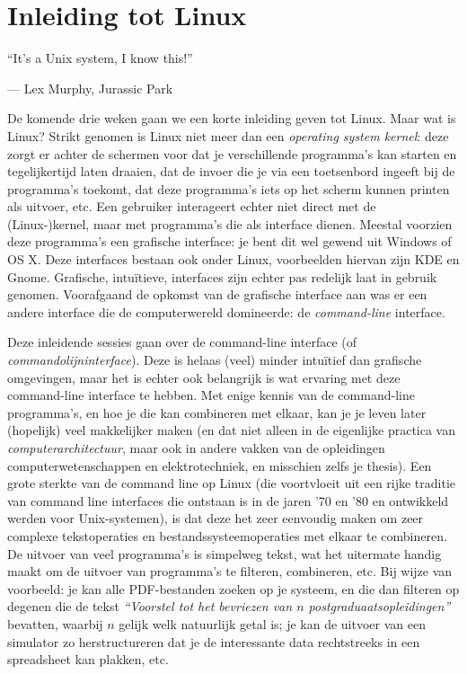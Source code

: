 \documentclass[a4paper,twoside,openany]{memoir}
\begin{document}
\epigraphfontsize{\small\itshape}

\chapter{Inleiding tot Linux}
\epigraph{``It’s a Unix system, I know this!''}{--- \textup{Lex Murphy}, Jurassic Park}

De komende drie weken gaan we een korte inleiding geven tot Linux. Maar wat is
Linux? Strikt genomen is Linux niet meer dan een \emph{operating system kernel}:
deze zorgt er achter de schermen voor dat je verschillende programma's kan
starten en tegelijkertijd laten draaien, dat de invoer die je via een
toetsenbord ingeeft bij de programma's toekomt, dat deze programma's iets op
het scherm kunnen printen als uitvoer, etc. Een gebruiker interageert echter
niet direct met de (Linux-)kernel, maar met programma's die als interface
dienen. Meestal voorzien deze programma's een grafische interface: je bent dit
wel gewend uit Windows of OS X. Deze interfaces bestaan ook onder Linux,
voorbeelden hiervan zijn KDE en Gnome. Grafische, intuïtieve, interfaces zijn
echter pas redelijk laat in gebruik genomen. Voorafgaand de opkomst van de
grafische interface aan was er een andere interface die de computerwereld
domineerde: de \emph{command-line} interface.

Deze inleidende sessies gaan over de command-line interface (of
\emph{commandolijninterface}). Deze is  helaas (veel) minder intuïtief
dan grafische omgevingen, maar het is echter ook belangrijk is wat ervaring
met deze command-line interface te hebben. Met enige kennis
van de command-line programma's, en hoe je die kan combineren met elkaar, kan je
je leven later (hopelijk) veel makkelijker maken (en dat niet alleen in de
eigenlijke practica van \emph{computerarchitectuur}, maar ook in andere vakken
van de opleidingen computerwetenschappen en elektrotechniek, en misschien zelfs
je thesis). Een grote sterkte van de command line op Linux (die voortvloeit uit
een rijke traditie van command line interfaces die ontstaan is in de jaren '70
en '80 en ontwikkeld werden voor Unix-systemen), is dat deze het zeer eenvoudig
maken om zeer complexe tekstoperaties en bestandssysteemoperaties met elkaar te
combineren. De uitvoer van veel programma's is simpelweg tekst, wat het
uitermate handig maakt om de uitvoer van programma's te filteren, combineren,
etc. Bij wijze van voorbeeld: je kan alle PDF-bestanden zoeken op je systeem, en
die dan filteren op degenen die de tekst \emph{``Voorstel tot het bevriezen van
$n$ postgraduaatsopleidingen''} bevatten, waarbij $n$ gelijk welk natuurlijk
getal is; je kan de uitvoer van een simulator zo herstructureren dat je de
interessante data rechtstreeks in een spreadsheet kan plakken, etc.
\end{document}
